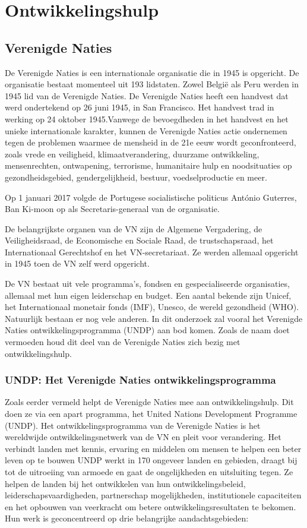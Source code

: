 \section{Ontwikkelingshulp}

\subsection{Verenigde Naties}
De Verenigde Naties is een internationale organisatie die in 1945 is opgericht. De organisatie bestaat momenteel uit 193 lidstaten. Zowel België als Peru werden in 1945 lid van de  Verenigde Naties. De Verenigde Naties heeft een handvest dat werd ondertekend op 26 juni 1945, in San Francisco. Het handvest trad in werking op 24 oktober 1945.Vanwege de bevoegdheden in het handvest en het unieke internationale karakter, kunnen de  Verenigde Naties actie ondernemen tegen de problemen waarmee de mensheid in de 21e eeuw wordt geconfronteerd, zoals vrede en veiligheid, klimaatverandering, duurzame ontwikkeling, mensenrechten, ontwapening, terrorisme, humanitaire hulp en noodsituaties op gezondheidsgebied, gendergelijkheid, bestuur, voedselproductie en meer. \autocite{Nations2020}

Op 1 januari 2017 volgde de Portugese socialistische politicus António Guterres, Ban Ki-moon op als Secretaris-generaal van de organisatie. 

De belangrijkste organen van de VN zijn de Algemene Vergadering, de Veiligheidsraad, de Economische en Sociale Raad, de trustschapsraad, het Internationaal Gerechtshof en het VN-secretariaat. Ze werden allemaal opgericht in 1945 toen de VN zelf werd opgericht. 

De VN bestaat uit vele programma's, fondsen en gespecialiseerde organisaties, allemaal met hun eigen leiderschap en budget. Een aantal bekende zijn Unicef, het Internationaal monetair fonds (IMF), Unesco, de wereld gezondheid (WHO). Natuurlijk bestaan er nog vele anderen. In dit onderzoek zal vooral het  Verenigde Naties ontwikkelingsprogramma (UNDP) aan bod komen. Zoals de naam doet vermoeden houd dit deel van de  Verenigde Naties zich bezig met ontwikkelingshulp.

\subsubsection{UNDP: Het Verenigde Naties ontwikkelingsprogramma}
Zoals eerder vermeld helpt de Verenigde Naties mee aan ontwikkelingshulp. Dit doen ze via een apart programma, het United Nations Development Programme (UNDP). Het ontwikkelingsprogramma van de  Verenigde Naties is het wereldwijde ontwikkelingsnetwerk van de VN en pleit voor verandering. Het verbindt landen met kennis, ervaring en middelen om mensen te helpen een beter leven op te bouwen UNDP werkt in 170 ongeveer landen en gebieden, draagt bij tot de uitroeiing van armoede en gaat de ongelijkheden en uitsluiting tegen. Ze helpen de landen bij het ontwikkelen van hun ontwikkelingsbeleid, leiderschapsvaardigheden, partnerschap mogelijkheden, institutionele capaciteiten en het opbouwen van veerkracht om betere ontwikkelingsresultaten te bekomen. \autocite{DevelopmentProgram2020}
Hun werk is geconcentreerd op drie belangrijke aandachtsgebieden:

